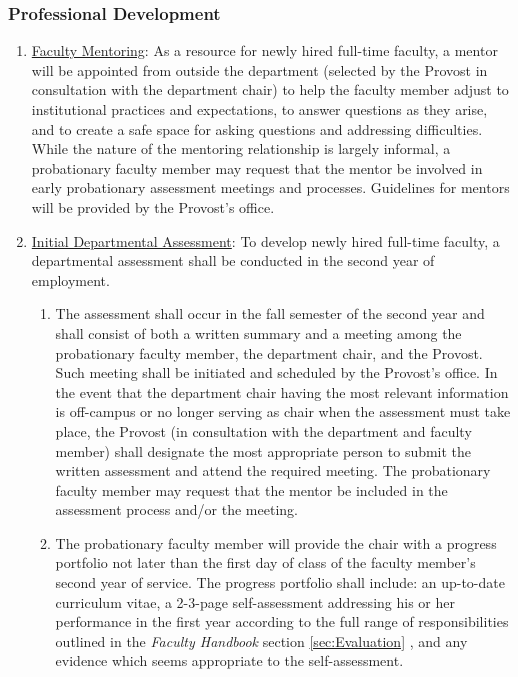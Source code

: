 		\subsubsection{Professional Development}
			\label{sec:ProfessionalDevelopment}
			\begin{enumerate}[label=\alph*)]

				\item{\underline{ Faculty Mentoring}:  As a resource for
					newly hired full-time faculty, a mentor will be
					appointed from outside the department (selected by the
					Provost in consultation with the department chair) to
					help the faculty member adjust to institutional
					practices and expectations, to answer questions as they
					arise, and to create a safe space for asking questions
					and addressing difficulties.  While the nature of the
					mentoring relationship is largely informal, a
					probationary faculty member may request that the mentor
					be involved in early probationary assessment meetings
					and processes.  Guidelines for mentors will be provided
					by the Provost's office. }

				\item{\underline{ Initial Departmental Assessment}:  To develop newly hired
					full-time faculty, a departmental assessment shall be conducted in the second
					year of employment.

					\begin{enumerate}[label=\arabic*)]

						\item{ The assessment shall occur in the fall semester of the
							second year and shall consist of both a written summary and a
							meeting among the probationary faculty member, the department
							chair, and the Provost.  Such meeting shall be initiated and
							scheduled by the Provost's office.  In the event that the
							department chair having the most relevant information is
							off-campus or no longer serving as chair when the assessment
							must take place, the Provost (in consultation with the
							department and faculty member) shall designate the most
							appropriate person to submit the written assessment and attend
							the required meeting.  The probationary faculty member may
							request that the mentor be included in the assessment process
							and/or the meeting. }

						\item{ The probationary faculty member will provide the chair
							with a progress portfolio not later than the first day of class
							of the faculty member's second year of service. The progress
							portfolio shall include:  an up-to-date curriculum vitae, a
							2-3-page self-assessment addressing his or her performance in
							the first year according to the full range of responsibilities
							outlined in the \emph{Faculty Handbook}
							section
							\ref{sec:Evaluation}
							, and any
							evidence which seems appropriate to the self-assessment. }


\end{enumerate}}
\end{enumerate}
